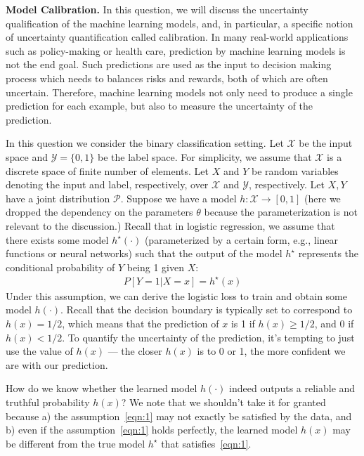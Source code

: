 \item {} {\bf Model Calibration.}
\renewcommand{\Pr}{P}
In this question, we will discuss the uncertainty qualification of the machine learning models, and, in particular, a specific notion of uncertainty quantification called calibration. 
In many  real-world applications such as policy-making or health care, prediction by machine learning models is not the end goal. Such predictions are used as  the input to decision making process which needs to balances risks and rewards, both of which are often uncertain. Therefore, machine learning models not only need to produce a single prediction for each example, but also to measure the uncertainty of the prediction. 

In this question we consider the binary classification setting. Let $\mathcal{X}$ be the input space and $\mathcal{Y}=\{0,1\}$ be the label space. For simplicity, we assume that $\mathcal{X}$ is a discrete space of finite number of elements. Let $X$ and $Y$ be random variables denoting the input and label, respectively, over $\mathcal{X}$ and $\mathcal{Y}$, respectively. Let $X,Y$ have a joint distribution $\mathcal{P}$. 
Suppose we have a model $h:\mathcal{X} \rightarrow [0,1]$ (here we dropped the dependency on the parameters $\theta$ because the parameterization is not relevant to the discussion.) Recall that in logistic regression, we assume that there exists some model $h^\star(\cdot)$ (parameterized by a certain form, e.g., linear functions or neural networks) such that the output of the model $h^\star$ represents the conditional probability of $Y$ being 1 given $X$:
\begin{align}
P\left[Y = 1 \vert X = x\right] = h^\star(x) \label{eqn:1}
\end{align}
Under this assumption, we can derive the logistic loss to train and obtain some model $h(\cdot)$. Recall that the decision boundary is typically set to correspond to $h(x) = 1/2$, which means that the prediction of $x$ is 1 if $h(x) \ge 1/2$, and 0 if $h(x) < 1/2$. To quantify the uncertainty of the prediction, it's tempting to just use the value of $h(x)$ --- the closer $h(x)$ is to 0 or 1, the more confident we are with our prediction. 

How do we know whether the learned model $h(\cdot)$ indeed outputs a reliable and truthful probability $h(x)$? We note that we shouldn't take it for granted because a) the assumption~\eqref{eqn:1} may not exactly be satisfied by the data, and b) even if the assumption~\eqref{eqn:1} holds perfectly, the learned model $h(x)$ may be different from the true model $h^\star$ that satisfies~\eqref{eqn:1}. 

